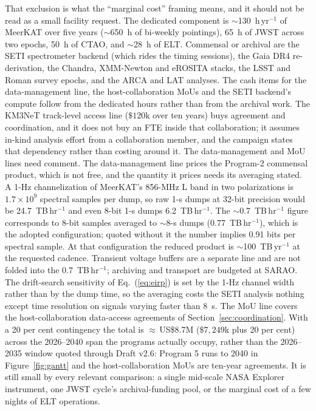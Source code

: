 \documentclass[11pt]{article}
\begin{document}
That exclusion is what the ``marginal cost'' framing means, and it should not be read as a small facility request. The dedicated component is $\sim$130~h\,yr$^{-1}$ of MeerKAT over five years ($\sim$650~h of bi-weekly pointings), 65~h of JWST across two epochs, 50~h of CTAO, and $\sim$28~h of ELT. Commensal or archival are the SETI spectrometer backend (which rides the timing sessions), the Gaia DR4 re-derivation, the Chandra, XMM-Newton and eROSITA stacks, the LSST and Roman survey epochs, and the ARCA and LAT analyses. The cash items for the data-management line, the host-collaboration MoUs and the SETI backend's compute follow from the dedicated hours rather than from the archival work. The KM3NeT track-level access line ($\$120$k over ten years) buys agreement and coordination, and it does not buy an FTE inside that collaboration; it assumes in-kind analysis effort from a collaboration member, and the campaign states that dependency rather than costing around it. The data-management and MoU lines need comment. The data-management line prices the Program-2 commensal product, which is not free, and the quantity it prices needs its averaging stated. A 1-Hz channelization of MeerKAT's 856-MHz L band in two polarizations is $1.7\times10^{9}$ spectral samples per dump, so raw 1-s dumps at 32-bit precision would be 24.7~TB\,hr$^{-1}$ and even 8-bit 1-s dumps 6.2~TB\,hr$^{-1}$. The $\sim$0.7~TB\,hr$^{-1}$ figure corresponds to 8-bit samples averaged to $\sim$8-s dumps (0.77~TB\,hr$^{-1}$), which is the adopted configuration; quoted without it the number implies 0.91 bits per spectral sample. At that configuration the reduced product is $\sim$100~TB\,yr$^{-1}$ at the requested cadence. Transient voltage buffers are a separate line and are not folded into the 0.7~TB\,hr$^{-1}$; archiving and transport are budgeted at SARAO. The drift-search sensitivity of Eq.~(\ref{eq:eirp}) is set by the 1-Hz channel width rather than by the dump time, so the averaging costs the SETI analysis nothing except time resolution on signals varying faster than 8~s. The MoU line covers the host-collaboration data-access agreements of Section~\ref{sec:coordination}. With a 20 per cent contingency the total is $\approx$\,US\$8.7M ($\$7{,}249$k plus 20 per cent) across the 2026--2040 span the programs actually occupy, rather than the 2026--2035 window quoted through Draft v2.6: Program 5 runs to 2040 in Figure~\ref{fig:gantt} and the host-collaboration MoUs are ten-year agreements. It is still small by every relevant comparison: a single mid-scale NASA Explorer instrument, one JWST cycle's archival-funding pool, or the marginal cost of a few nights of ELT operations.
\end{document}
